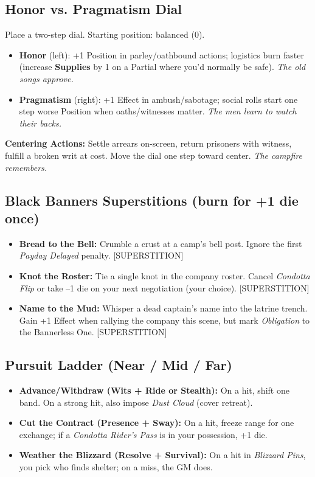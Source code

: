 \subsection*{Honor vs. Pragmatism Dial}

Place a two-step dial. Starting position: balanced (0).

\begin{itemize}
    \item \textbf{Honor} (left): +1 Position in parley/oathbound actions; logistics burn faster (increase \textbf{Supplies} by 1 on a Partial where you'd normally be safe). \textit{The old songs approve.}
    \item \textbf{Pragmatism} (right): +1 Effect in ambush/sabotage; social rolls start one step worse Position when oaths/witnesses matter. \textit{The men learn to watch their backs.}
\end{itemize}

\textbf{Centering Actions:} Settle arrears on-screen, return prisoners with witness, fulfill a broken writ at cost. Move the dial one step toward center. \textit{The campfire remembers.}

\subsection*{Black Banners Superstitions (burn for +1 die once)}
\begin{itemize}
    \item \textbf{Bread to the Bell:} Crumble a crust at a camp's bell post. Ignore the first \emph{Payday Delayed} penalty. [SUPERSTITION]
    \item \textbf{Knot the Roster:} Tie a single knot in the company roster. Cancel \emph{Condotta Flip} or take --1 die on your next negotiation (your choice). [SUPERSTITION]
    \item \textbf{Name to the Mud:} Whisper a dead captain's name into the latrine trench. Gain +1 Effect when rallying the company this scene, but mark \emph{Obligation} to the Bannerless One. [SUPERSTITION]
\end{itemize}

\subsection*{Pursuit Ladder (Near / Mid / Far)}
\begin{itemize}
    \item \textbf{Advance/Withdraw (Wits + Ride or Stealth):} On a hit, shift one band. On a strong hit, also impose \emph{Dust Cloud} (cover retreat).
    \item \textbf{Cut the Contract (Presence + Sway):} On a hit, freeze range for one exchange; if a \emph{Condotta Rider's Pass} is in your possession, +1 die.
    \item \textbf{Weather the Blizzard (Resolve + Survival):} On a hit in \emph{Blizzard Pins}, you pick who finds shelter; on a miss, the GM does.
\end{itemize}

